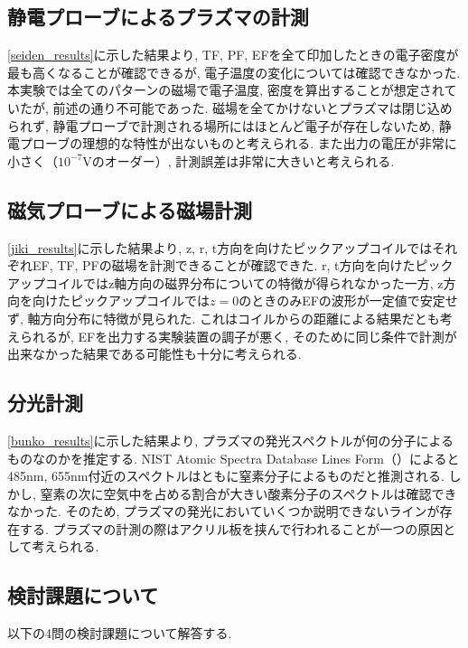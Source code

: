 \documentclass[]{jsarticle}
\begin{document}
	\subsection{静電プローブによるプラズマの計測}
	\ref{seiden_results}に示した結果より, TF, PF, EFを全て印加したときの電子密度が最も高くなることが確認できるが, 電子温度の変化については確認できなかった. 本実験では全てのパターンの磁場で電子温度, 密度を算出することが想定されていたが, 前述の通り不可能であった. 磁場を全てかけないとプラズマは閉じ込められず, 静電プローブで計測される場所にはほとんど電子が存在しないため, 静電プローブの理想的な特性が出ないものと考えられる. また出力の電圧が非常に小さく（$10^{-7}$Vのオーダー）, 計測誤差は非常に大きいと考えられる. 	
	
	\subsection{磁気プローブによる磁場計測}
	\ref{jiki_results}に示した結果より, z, r, t方向を向けたピックアップコイルではそれぞれEF, TF, PFの磁場を計測できることが確認できた. r, t方向を向けたピックアップコイルではz軸方向の磁界分布についての特徴が得られなかった一方, z方向を向けたピックアップコイルでは$z = 0$のときのみEFの波形が一定値で安定せず, 軸方向分布に特徴が見られた. これはコイルからの距離による結果だとも考えられるが, EFを出力する実験装置の調子が悪く, そのために同じ条件で計測が出来なかった結果である可能性も十分に考えられる. 
	
	\subsection{分光計測}
	\ref{bunko_results}に示した結果より, プラズマの発光スペクトルが何の分子によるものなのかを推定する. NIST Atomic Spectra Database Lines Form（\cite{NIST}）によると485nm, 655nm付近のスペクトルはともに窒素分子によるものだと推測される. しかし, 窒素の次に空気中を占める割合が大きい酸素分子のスペクトルは確認できなかった. そのため, プラズマの発光においていくつか説明できないラインが存在する. プラズマの計測の際はアクリル板を挟んで行われることが一つの原因として考えられる. 

	
	\subsection{検討課題について\label{tasks}}
	以下の4問の検討課題について解答する. 
	
\end{document}
